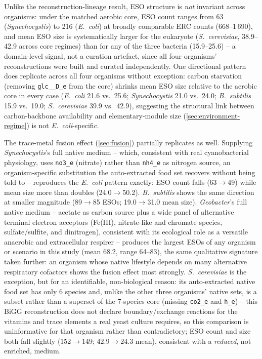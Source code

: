 \documentclass[nocrop]{bioinfo}
\begin{document}
Unlike the reconstruction-lineage result, ESO structure is \emph{not} invariant across
organisms: under the matched aerobic core, ESO count ranges from 63 (\textit{Synechocystis}) to
216 (\textit{E.\ coli}) at broadly comparable ERC counts (668--1\,690), and mean ESO size is
systematically larger for the eukaryote (\textit{S.\ cerevisiae}, 38.9--42.9 across core regimes)
than for any of the three bacteria (15.9--25.6) -- a domain-level signal, not a curation
artefact, since all four organisms' reconstructions were built and curated independently.
One directional pattern does replicate across all four organisms without exception: carbon
starvation (removing \texttt{glc\_\_D\_e} from the core) shrinks mean ESO size relative to the
aerobic core in every case (\textit{E.\ coli} 21.6 vs.\ 25.6; \textit{Synechocystis} 21.0 vs.\
24.0; \textit{B.\ subtilis} 15.9 vs.\ 19.0; \textit{S.\ cerevisiae} 39.9 vs.\ 42.9), suggesting
the structural link between carbon-backbone availability and elementary-module size
(\cref{sec:environment-regime}) is not \textit{E.\ coli}-specific.

The trace-metal fusion effect (\cref{sec:fusion}) partially replicates as well. Supplying
\textit{Synechocystis}'s full native medium -- which, consistent with real cyanobacterial
physiology, uses \texttt{no3\_e} (nitrate) rather than \texttt{nh4\_e} as nitrogen source, an
organism-specific substitution the auto-extracted food set recovers without being told to --
reproduces the \textit{E.\ coli} pattern exactly: ESO count falls (63$\to$49) while mean size
more than doubles (24.0$\to$50.2). \textit{B.\ subtilis} shows the same direction at smaller
magnitude (89$\to$85 ESOs; 19.0$\to$31.0 mean size). \textit{Geobacter}'s full native medium --
acetate as carbon source plus a wide panel of alternative terminal electron acceptors
(Fe(III), nitrate-like and chromate species, sulfate/sulfite, and dinitrogen), consistent with
its ecological role as a versatile anaerobic and extracellular respirer -- produces the largest
ESOs of any organism or scenario in this study (mean 68.2, range 64--83), the same
qualitative signature taken further: an organism whose native lifestyle depends on many
alternative respiratory cofactors shows the fusion effect most strongly. \textit{S.\ cerevisiae}
is the exception, but for an identifiable, non-biological reason: its auto-extracted native
food set has only 6 species and, unlike the other three organisms' native sets, is a subset
rather than a superset of the 7-species core (missing \texttt{co2\_e} and \texttt{h\_e}) --
this BiGG reconstruction does not declare boundary/exchange reactions for the vitamins and
trace elements a real yeast culture requires, so this comparison is uninformative for that
organism rather than contradictory; ESO count and size both fall slightly (152$\to$149;
42.9$\to$24.3 mean), consistent with a \emph{reduced}, not enriched, medium.
\end{document}
